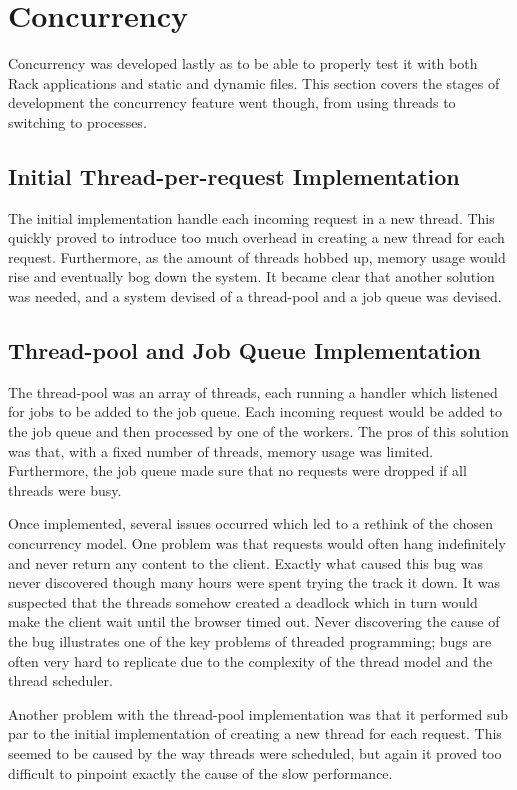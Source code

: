 \section{Concurrency}
Concurrency was developed lastly as to be able to properly test it with both
Rack applications and static and dynamic files. This section covers the stages
of development the concurrency feature went though, from using threads to
switching to processes.

\subsection{Initial Thread-per-request Implementation}
The initial implementation handle each incoming request in a new thread. This
quickly proved to introduce too much overhead in creating a new thread for
each request. Furthermore, as the amount of threads hobbed up, memory usage
would rise and eventually bog down the system.  It became clear that another
solution was needed, and a system devised of a thread-pool and a job queue was
devised. 

\subsection{Thread-pool and Job Queue Implementation}
The thread-pool was an array of threads, each running a handler which listened
for jobs to be added to the job queue. Each incoming request would be added to
the job queue and then processed by one of the workers. The pros of this
solution was that, with a fixed number of threads, memory usage was limited.
Furthermore, the job queue made sure that no requests were dropped if all
threads were busy. 

Once implemented, several issues occurred which led to a rethink of the chosen
concurrency model. One problem was that requests would often hang indefinitely
and never return any content to the client. Exactly what caused this bug was
never discovered though many hours were spent trying the track it down. It was
suspected that the threads somehow created a deadlock which in turn would make
the client wait until the browser timed out.  Never discovering the cause of
the bug illustrates one of the key problems of threaded programming; bugs are
often very hard to replicate due to the complexity of the thread model and the
thread scheduler. 

Another problem with the thread-pool implementation was that it performed sub
par to the initial implementation of creating a new thread for each request.
This seemed to be caused by the way threads were scheduled, but again it
proved too difficult to pinpoint exactly the cause of the slow performance.

